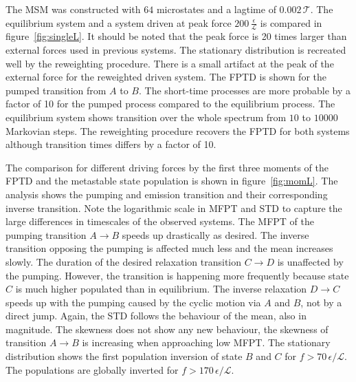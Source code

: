 The MSM was constructed with $64$ microstates and a lagtime of $0.002\,\mathcal{T}$. The equilibrium system and a system driven at peak force $200\,\frac{\epsilon}{\mathcal{L}}$ is compared in figure~\ref{fig:singleL}. It should be noted that the peak force is 20 times larger than external forces used in previous systems.  The stationary distribution is recreated well by the reweighting procedure. There is a small artifact at the peak of the external force for the reweighted driven system. The FPTD is shown for the pumped transition from $A$ to $B$. The short-time processes are more probable by a factor of 10 for the pumped process compared to the equilibrium process. The equilibrium system shows transition over the whole spectrum from $10$ to $10000$ Markovian steps. The reweighting procedure recovers the FPTD for both systems although transition times differs by a factor of 10. 

The comparison for different driving forces by the first three moments of the FPTD and the metastable state population is shown in figure~\ref{fig:momL}. The analysis shows the pumping and emission transition and their corresponding inverse transition. Note the logarithmic scale in MFPT and STD to capture the large differences in timescales of the observed systems. The MFPT of the pumping transition $A \rightarrow B$ speeds up drastically as desired. The inverse transition opposing the pumping is affected much less and the mean increases slowly. The duration of the desired relaxation transition $C \rightarrow D$ is unaffected by the pumping. However, the transition is happening more frequently because state $C$ is much higher populated than in equilibrium. The inverse relaxation $D \rightarrow C$  speeds up with the pumping  caused by the cyclic motion via $A$ and $B$, not by a direct jump. Again, the STD follows the behaviour of the mean, also in magnitude. The skewness does not show any new behaviour, the skewness of transition $A \rightarrow B$ is increasing when approaching low MFPT. The stationary distribution shows the first population inversion of state $B$ and $C$ for $ f> 70\,\epsilon / \mathcal{L}$. The populations are globally inverted for $f > 170\,\epsilon / \mathcal{L}$.

